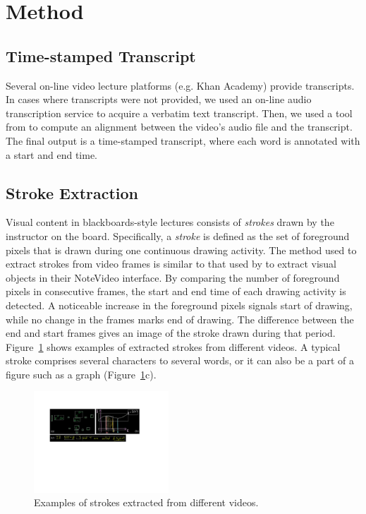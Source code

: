\section{Method}
\subsection{Time-stamped Transcript}
Several on-line video lecture platforms (e.g. Khan Academy) provide transcripts. In cases where transcripts were not provided, we used an on-line audio transcription service to acquire a verbatim text transcript. Then, we used a tool from \cite{rubin2013content} to compute an alignment between the video's audio file and the transcript. The final output is a time-stamped transcript, where each word is annotated with a start and end time.

\subsection{Stroke Extraction}
Visual content in blackboards-style lectures consists of \textit{strokes} drawn by the instructor on the board. Specifically, a \textit{stroke} is defined as the set of foreground pixels that is drawn during one continuous drawing activity. The method used to extract strokes from video frames is similar to that used by \cite{monserrat2013notevideo} to extract visual objects in their NoteVideo interface. By comparing the number of foreground pixels in consecutive frames, the start and end time of each drawing activity is detected. A noticeable increase in the foreground pixels signals start of drawing, while no change in the frames marks end of drawing. The difference between the end and start frames gives an image of the stroke drawn during that period. Figure~\ref{Fig:stroke_examples} shows examples of extracted strokes from different videos. A typical stroke comprises several characters to several words, or it can also be a part of a figure such as a graph (Figure~\ref{Fig:stroke_examples}c).  

\begin{figure}[h]
       \centering
        \includegraphics[width=0.45\textwidth, clip=true]{images/example_strokes}
        \caption{Examples of strokes extracted from different videos.}
        \label{Fig:stroke_examples}
\end{figure}

